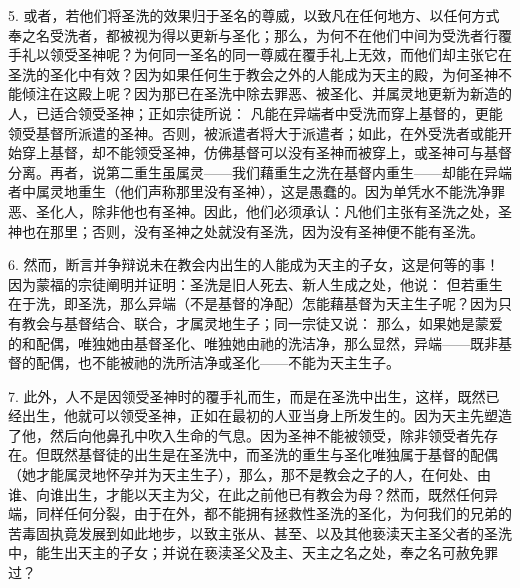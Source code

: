 5. 或者，若他们将圣洗的效果归于圣名的尊威，以致凡在任何地方、以任何方式奉之名受洗者，都被视为得以更新与圣化；那么，为何不在他们中间为受洗者行覆手礼以领受圣神呢？为何同一圣名的同一尊威在覆手礼上无效，而他们却主张它在圣洗的圣化中有效？因为如果任何生于教会之外的人能成为天主的殿，为何圣神不能倾注在这殿上呢？因为那已在圣洗中除去罪恶、被圣化、并属灵地更新为新造的人，已适合领受圣神；正如宗徒所说： 凡能在异端者中受洗而穿上基督的，更能领受基督所派遣的圣神。否则，被派遣者将大于派遣者；如此，在外受洗者或能开始穿上基督，却不能领受圣神，仿佛基督可以没有圣神而被穿上，或圣神可与基督分离。再者，说第二重生虽属灵——我们藉重生之洗在基督内重生——却能在异端者中属灵地重生（他们声称那里没有圣神），这是愚蠢的。因为单凭水不能洗净罪恶、圣化人，除非他也有圣神。因此，他们必须承认：凡他们主张有圣洗之处，圣神也在那里；否则，没有圣神之处就没有圣洗，因为没有圣神便不能有圣洗。\par

6. 然而，断言并争辩说未在教会内出生的人能成为天主的子女，这是何等的事！因为蒙福的宗徒阐明并证明：圣洗是旧人死去、新人生成之处，他说： 但若重生在于洗，即圣洗，那么异端（不是基督的净配）怎能藉基督为天主生子呢？因为只有教会与基督结合、联合，才属灵地生子；同一宗徒又说： 那么，如果她是蒙爱的和配偶，唯独她由基督圣化、唯独她由祂的洗洁净，那么显然，异端——既非基督的配偶，也不能被祂的洗所洁净或圣化——不能为天主生子。\par

7. 此外，人不是因领受圣神时的覆手礼而生，而是在圣洗中出生，这样，既然已经出生，他就可以领受圣神，正如在最初的人亚当身上所发生的。因为天主先塑造了他，然后向他鼻孔中吹入生命的气息。因为圣神不能被领受，除非领受者先存在。但既然基督徒的出生是在圣洗中，而圣洗的重生与圣化唯独属于基督的配偶（她才能属灵地怀孕并为天主生子），那么，那不是教会之子的人，在何处、由谁、向谁出生，才能以天主为父，在此之前他已有教会为母？然而，既然任何异端，同样任何分裂，由于在外，都不能拥有拯救性圣洗的圣化，为何我们的兄弟的苦毒固执竟发展到如此地步，以致主张从、甚至、以及其他亵渎天主圣父者的圣洗中，能生出天主的子女；并说在亵渎圣父及主、天主之名之处，奉之名可赦免罪过？\par

